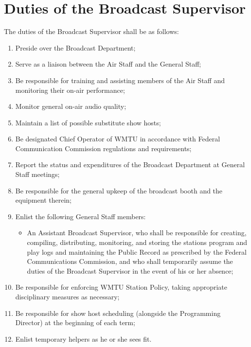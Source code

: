 \documentclass[12pt]{constitution}
\begin{document}
\section{​Duties of the Broadcast Supervisor}
The duties of the Broadcast Supervisor shall be as follows:
\begin{enumerate}
\item Preside over the Broadcast Department;
\item Serve as a liaison between the Air Staff and the General Staff;
\item Be responsible for training and assisting members of the Air Staff and monitoring their on-­air performance;
\item Monitor general on-­air audio quality;
\item Maintain a list of possible substitute show hosts;
\item Be designated Chief Operator of WMTU in accordance with Federal Communication Commission regulations and requirements;
\item Report the status and expenditures of the Broadcast Department at General Staff meetings;
\item Be responsible for the general upkeep of the broadcast booth and the equipment therein;
\item Enlist the following General Staff members:
\begin{itemize}
\item An Assistant Broadcast Supervisor, who shall be responsible for creating, compiling, distributing, monitoring, and storing the stations program and play logs and maintaining the Public Record as prescribed by the Federal Communications Commission, and who shall temporarily assume the duties of the Broadcast Supervisor in the event of his or her absence;
\end{itemize}
\item Be responsible for enforcing WMTU Station Policy, taking appropriate disciplinary measures as necessary;
\item Be responsible for show host scheduling (alongside the Programming Director) at the beginning of each term;
\item Enlist temporary helpers as he or she sees fit.
\end{enumerate}
\end{document}
